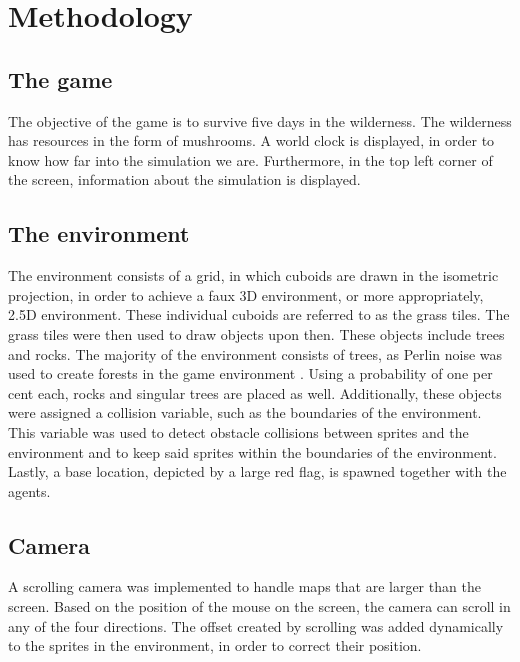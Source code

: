 \section{Methodology} \label{section:methodology}



\subsection{The game} \label{subsection:game}
The objective of the game is to survive five days in the wilderness.
The wilderness has resources in the form of mushrooms.
A world clock is displayed, in order to know how far into the simulation we are.
Furthermore, in the top left corner of the screen, information about the simulation is displayed.

\subsection{The environment} \label{subsection:environment}
The environment consists of a grid, in which cuboids are drawn in the isometric projection, in order to achieve a faux 3D environment, or more appropriately, 2.5D environment.
These individual cuboids are referred to as the grass tiles.
The grass tiles were then used to draw objects upon then.
These objects include trees and rocks.
The majority of the environment consists of trees, as Perlin noise was used to create forests in the game environment \cite[Chapter~4]{shaker2016procedural,perlin1985image}.
Using a probability of one per cent each, rocks and singular trees are placed as well.
Additionally, these objects were assigned a collision variable, such as the boundaries of the environment.
This variable was used to detect obstacle collisions between sprites and the environment and to keep said sprites within the boundaries of the environment.    
Lastly, a base location, depicted by a large red flag, is spawned together with the agents.


\subsection{Camera} \label{subsection:camera}
A scrolling camera was implemented to handle maps that are larger than the screen. 
Based on the position of the mouse on the screen, the camera can scroll in any of the four directions.
The offset created by scrolling was added dynamically to the sprites in the environment, in order to correct their position.

